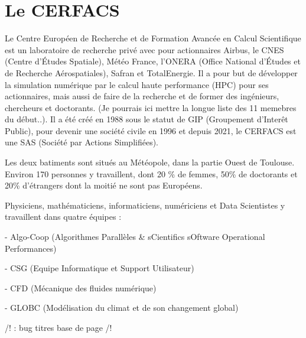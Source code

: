 \chapter{Le CERFACS}

Le Centre Européen de Recherche et de Formation Avancée en Calcul Scientifique est un laboratoire de recherche privé avec pour actionnaires Airbus, le CNES (Centre d'Études Spatiale), Météo France, l'ONERA (Office National d'Études et de Recherche Aérospatiales), Safran et TotalEnergie. Il a pour but de développer la simulation numérique par le calcul haute performance (HPC) pour ses actionnaires, mais aussi de faire de la recherche et de former des ingénieurs, chercheurs et doctorants. (Je pourrais ici mettre la longue liste des 11 memebres du début..). Il a été créé en 1988 sous le statut de GIP (Groupement d'Interêt Public), pour devenir une société civile en 1996 et depuis 2021, le CERFACS est une SAS (Société par Actions Simplifiées).

Les deux batiments sont situés au Météopole, dans la partie Ouest de Toulouse. Environ 170 personnes y travaillent, dont 20 \% de femmes, 50\% de doctorants et 20\% d'étrangers dont la moitié ne sont pas Européens.

Physiciens, mathématiciens, informaticiens, numériciens et Data Scientistes y travaillent dans quatre équipes :

- Algo-Coop (Algorithmes Parallèles \& sCientifics sOftware Operational Performances)

- CSG (Equipe Informatique et Support Utilisateur)

- CFD (Mécanique des fluides numérique)

- GLOBC (Modélisation du climat et de son changement global)


/! : bug titres base de page /! \vspace*{0.5\baselineskip}\linebreak

